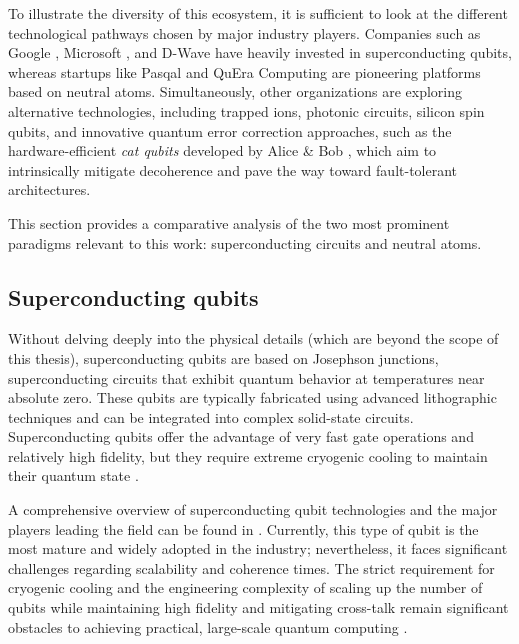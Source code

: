To illustrate the diversity of this ecosystem, it is sufficient to look at the different technological pathways chosen by major industry players. Companies such as Google \cite{google2024whatisquantum}, Microsoft \cite{microsoft_majorana1}, and D-Wave \cite{mcgeoch2020dwaveReview} have heavily invested in superconducting qubits, whereas startups like Pasqal \cite{Henriet2020quantumcomputing} and QuEra Computing \cite{ebadi2022quantum} are pioneering platforms based on neutral atoms. Simultaneously, other organizations are exploring alternative technologies, including trapped ions, photonic circuits, silicon spin qubits, and innovative quantum error correction approaches, such as the hardware-efficient \textit{cat qubits} developed by Alice \& Bob \cite{alicebob2024white}, which aim to intrinsically mitigate decoherence and pave the way toward fault-tolerant architectures.

This section provides a comparative analysis of the two most prominent paradigms relevant to this work: superconducting circuits and neutral atoms.

\subsection{Superconducting qubits}

Without delving deeply into the physical details (which are beyond the scope of this thesis), superconducting qubits are based on Josephson junctions, superconducting circuits that exhibit quantum behavior at temperatures near absolute zero. These qubits are typically fabricated using advanced lithographic techniques and can be integrated into complex solid-state circuits. Superconducting qubits offer the advantage of very fast gate operations and relatively high fidelity, but they require extreme cryogenic cooling to maintain their quantum state \cite{google2024whatisquantum}. 

A comprehensive overview of superconducting qubit technologies and the major players leading the field can be found in \cite{quantumReport}. Currently, this type of qubit is the most mature and widely adopted in the industry; nevertheless, it faces significant challenges regarding scalability and coherence times. The strict requirement for cryogenic cooling and the engineering complexity of scaling up the number of qubits while maintaining high fidelity and mitigating cross-talk remain significant obstacles to achieving practical, large-scale quantum computing \cite{quantumReport}.

